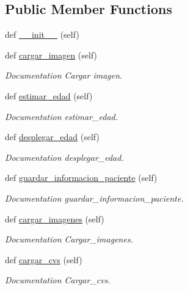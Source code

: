 \subsection*{Public Member Functions}
\begin{DoxyCompactItemize}
\item 
def \mbox{\hyperlink{class_facade_1_1_facade_ad3ab1700c8824f9711bb33c34187f2b4}{\+\_\+\+\_\+init\+\_\+\+\_\+}} (self)
\item 
def \mbox{\hyperlink{class_facade_1_1_facade_a04ad2739895ce3afb592870e79e90d1d}{cargar\+\_\+imagen}} (self)
\begin{DoxyCompactList}\small\item\em Documentation Cargar imagen. \end{DoxyCompactList}\item 
def \mbox{\hyperlink{class_facade_1_1_facade_a31c82e317bb43cffa46140c2826a908b}{estimar\+\_\+edad}} (self)
\begin{DoxyCompactList}\small\item\em Documentation estimar\+\_\+edad. \end{DoxyCompactList}\item 
def \mbox{\hyperlink{class_facade_1_1_facade_a92d3a050a1526997ed8d0c080c016b77}{desplegar\+\_\+edad}} (self)
\begin{DoxyCompactList}\small\item\em Documentation desplegar\+\_\+edad. \end{DoxyCompactList}\item 
def \mbox{\hyperlink{class_facade_1_1_facade_a2d6ce899835aaae1a3b6022444d7127a}{guardar\+\_\+informacion\+\_\+paciente}} (self)
\begin{DoxyCompactList}\small\item\em Documentation guardar\+\_\+informacion\+\_\+paciente. \end{DoxyCompactList}\item 
def \mbox{\hyperlink{class_facade_1_1_facade_a04f3d8f489b9054d4d40ac2a60c1881e}{cargar\+\_\+imagenes}} (self)
\begin{DoxyCompactList}\small\item\em Documentation Cargar\+\_\+imagenes. \end{DoxyCompactList}\item 
def \mbox{\hyperlink{class_facade_1_1_facade_a85dbe0a181d1c4665004b284f13e3632}{cargar\+\_\+cvs}} (self)
\begin{DoxyCompactList}\small\item\em Documentation Cargar\+\_\+cvs. \end{DoxyCompactList}\item 

\end{DoxyCompactItemize}
